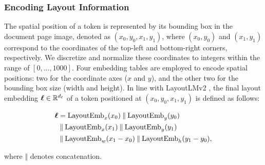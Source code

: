 \subsubsection{Encoding Layout Information}

The spatial position of a token is represented by its bounding box in the document page image, denoted as $(x_0, y_0, x_1, y_1)$, where $(x_0, y_0)$ and $(x_1, y_1)$ correspond to the coordinates of the top-left and bottom-right corners, respectively. We discretize and normalize these coordinates to integers within the range of $[0, ..., 1000]$. Four embedding tables are employed to encode spatial positions: two for the coordinate axes ($x$ and $y$), and the other two for the bounding box size (width and height). In line with LayoutLMv2 \citep{xu2020layoutlmv2}, the final layout embedding $\boldsymbol{\ell} \in \mathbb{R}^{d_{\ell}}$ of a token positioned at $(x_0, y_0, x_1, y_1)$ is defined as follows:

\begin{equation}
\begin{split}
    \boldsymbol{\ell} & = \text{LayoutEmb}_x(x_0) \mathbin\Vert \text{LayoutEmb}_y(y_0) \\
    & \mathbin\Vert \text{LayoutEmb}_x(x_1) \mathbin\Vert \text{LayoutEmb}_y(y_1) \\
    & \mathbin\Vert \text{LayoutEmb}_w(x_1 - x_0) \mathbin\Vert \text{LayoutEmb}_h(y_1 - y_0), 
\end{split}
\label{eq:layout-embeddings}
\end{equation}

\noindent where $\mathbin\Vert$ denotes concatenation.

